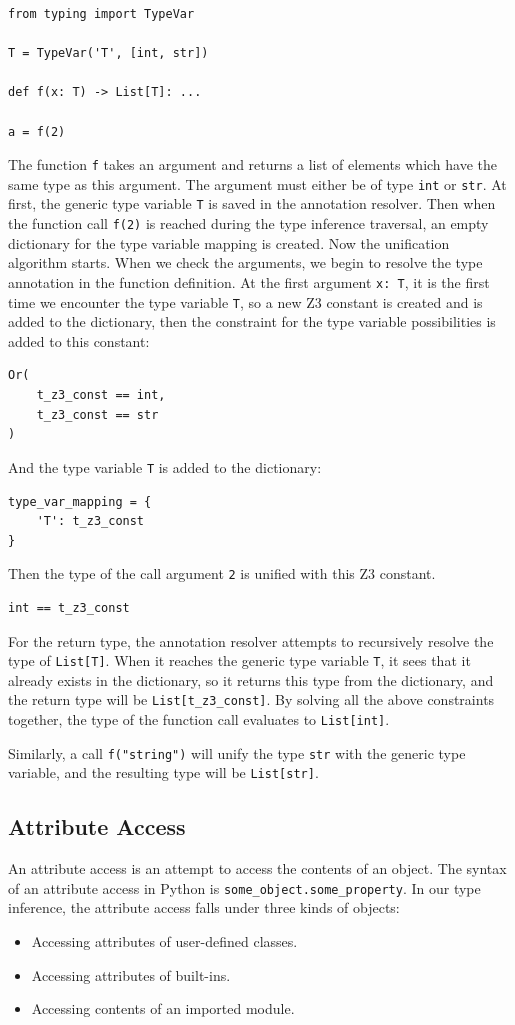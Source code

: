 \begin{lstlisting}
from typing import TypeVar

T = TypeVar('T', [int, str])

def f(x: T) -> List[T]: ...

a = f(2)
\end{lstlisting}
The function \lstinline|f| takes an argument and returns a list of elements which have the same type as this argument. The argument must either be of type \lstinline|int| or \lstinline|str|. At first, the generic type variable \lstinline|T| is saved in the annotation resolver. Then when the function call \lstinline|f(2)| is reached during the type inference traversal, an empty dictionary for the type variable mapping is created. Now the unification algorithm starts. When we check the arguments, we begin to resolve the type annotation in the function definition. At the first argument \lstinline|x: T|, it is the first time we encounter the type variable \lstinline|T|, so a new Z3 constant is created and is added to the dictionary, then the constraint for the type variable possibilities is added to this constant:
\begin{lstlisting}
Or(
	t_z3_const == int,
	t_z3_const == str
)
\end{lstlisting}
And the type variable \lstinline|T| is added to the dictionary:
\begin{lstlisting}
type_var_mapping = {
	'T': t_z3_const
}
\end{lstlisting}
Then the type of the call argument \lstinline|2| is unified with this Z3 constant.
\begin{lstlisting}
int == t_z3_const
\end{lstlisting}
For the return type, the annotation resolver attempts to recursively resolve the type of \lstinline|List[T]|. When it reaches the generic type variable \lstinline|T|, it sees that it already exists in the dictionary, so it returns this type from the dictionary, and the return type will be \lstinline|List[t_z3_const]|. By solving all the above constraints together, the type of the function call evaluates to \lstinline|List[int]|.

Similarly, a call \lstinline|f("string")| will unify the type \lstinline|str| with the generic type variable, and the resulting type will be \lstinline|List[str]|.
 
\subsection{Attribute Access}
An attribute access is an attempt to access the contents of an object. The syntax of an attribute access in Python is \lstinline|some_object.some_property|. In our type inference, the attribute access falls under three kinds of objects:
\begin{itemize}
	\item Accessing attributes of user-defined classes.
	\item Accessing attributes of built-ins.
	\item Accessing contents of an imported module.
\end{itemize}

